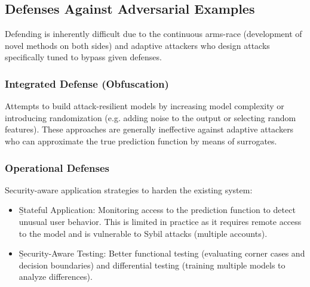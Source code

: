 \subsection{Defenses Against Adversarial Examples}
Defending is inherently difficult due to the continuous arms-race (development of novel methods on both sides) and adaptive attackers who design attacks specifically tuned to bypass given defenses.

\subsubsection{Integrated Defense (Obfuscation)}
Attempts to build attack-resilient models by increasing model complexity or introducing randomization (e.g. adding noise to the output or selecting random features). These approaches are generally ineffective against adaptive attackers who can approximate the true prediction function by means of surrogates.


\subsubsection{Operational Defenses}Security-aware application strategies to harden the existing system:
\begin{itemize}
\item \b{Stateful Application}: Monitoring access to the prediction function to detect unusual user behavior. This is limited in practice as it requires remote access to the model and is vulnerable to Sybil attacks (multiple accounts).
\item \b{Security-Aware Testing}: Better functional testing (evaluating corner cases and decision boundaries) and differential testing (training multiple models to analyze differences).
\end{itemize}




